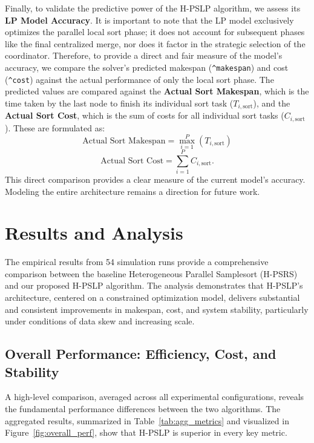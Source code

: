\documentclass{article}
\begin{document}
Finally, to validate the predictive power of the H-PSLP algorithm, we assess its \textbf{LP Model Accuracy}. It is important to note that the LP model exclusively optimizes the parallel local sort phase; it does not account for subsequent phases like the final centralized merge, nor does it factor in the strategic selection of the coordinator. Therefore, to provide a direct and fair measure of the model's accuracy, we compare the solver's predicted makespan (\texttt{\^{}makespan}) and cost (\texttt{\^{}cost}) against the actual performance of only the local sort phase. The predicted values are compared against the \textbf{Actual Sort Makespan}, which is the time taken by the last node to finish its individual sort task ($T_{i, \text{sort}}$), and the \textbf{Actual Sort Cost}, which is the sum of costs for all individual sort tasks ($C_{i, \text{sort}}$). These are formulated as:
\[ \text{Actual Sort Makespan} = \max_{i=1}^{P} (T_{i, \text{sort}}) \]
\[ \text{Actual Sort Cost} = \sum_{i=1}^{P} C_{i, \text{sort}}. \]
This direct comparison provides a clear measure of the current model's accuracy. Modeling the entire architecture remains a direction for future work.





\section{Results and Analysis}

The empirical results from 54 simulation runs provide a comprehensive comparison between the baseline Heterogeneous Parallel Samplesort (H-PSRS) and our proposed H-PSLP algorithm. The analysis demonstrates that H-PSLP's architecture, centered on a constrained optimization model, delivers substantial and consistent improvements in makespan, cost, and system stability, particularly under conditions of data skew and increasing scale.

\subsection{Overall Performance: Efficiency, Cost, and Stability}

A high-level comparison, averaged across all experimental configurations, reveals the fundamental performance differences between the two algorithms. The aggregated results, summarized in Table~\ref{tab:agg_metrics} and visualized in Figure~\ref{fig:overall_perf}, show that H-PSLP is superior in every key metric.
\end{document}
